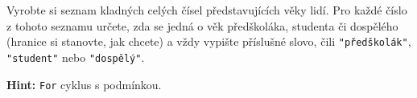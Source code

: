 \question[50]
Vyrobte si seznam kladných celých čísel představujících věky lidí. Pro každé
číslo z tohoto seznamu určete, zda se jedná o věk předškoláka, studenta či
dospělého (hranice si stanovte, jak chcete) a vždy vypište příslušné slovo, čili
\texttt{"předškolák"}, \texttt{"student"} nebo \texttt{"dospělý"}.

\textbf{Hint:} \texttt{For} cyklus s podmínkou.